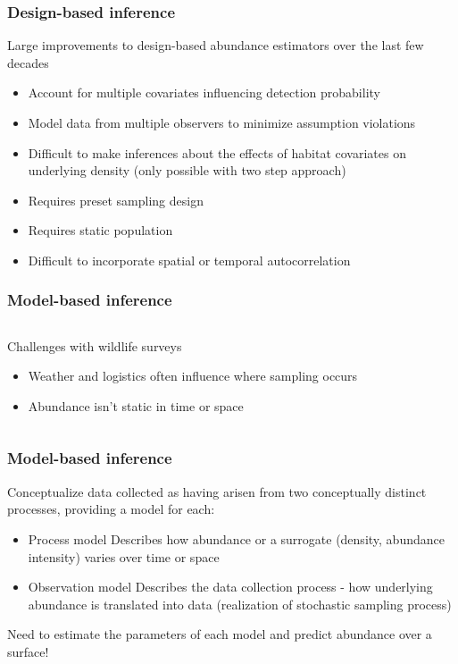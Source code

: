 \documentclass[serif,mathserif]{beamer}
\begin{document}
\begin{frame}
  \frametitle{Design-based inference}
  Large improvements to design-based abundance estimators over the last few decades
   \begin{itemize}
  \item Account for multiple covariates influencing detection probability \pause
  \item Model data from multiple observers to minimize assumption violations \pause
  \item \color{noaaturq} Difficult to make inferences about the effects of habitat covariates
  on underlying density (only possible with two step approach) \pause
  \item Requires preset sampling design \pause
  \item Requires static population \pause
  \item Difficult to incorporate spatial or temporal autocorrelation
  \end{itemize}
\end{frame}

\begin{frame}
  \frametitle{Model-based inference}
  \begin{columns}[c]
  \column{1.5in}
  \begin{block}{Challenges with wildlife surveys}
    \begin{itemize}
    \item Weather and logistics often influence
    where sampling occurs
    \item Abundance isn't static in time or space
    \end{itemize}
  \end{block}
  \column{2in}
  \end{columns}
\end{frame}

\begin{frame}
  \frametitle{Model-based inference}
    Conceptualize data collected as having arisen from two conceptually
     distinct processes, providing a model for each:
    \begin{itemize}
    \item {\color{noaaturq} Process model} Describes how abundance or a surrogate
       (density, abundance intensity) varies over time or space \pause
    \item {\color{noaaturq} Observation model} Describes the data collection process - how underlying abundance is translated into data (realization of stochastic sampling process) \pause
    \end{itemize}
    {\color{noaaturq}Need to estimate the parameters of each model and predict abundance over a surface!}
\end{frame}
\end{document}
